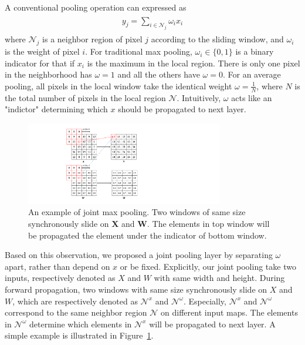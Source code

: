 A conventional pooling operation can expressed as
\begin{eqnarray}\label{pooling}
\begin{aligned}
y_{j} = \sum_{i\in \mathcal{N}_{j}} \omega_{i}x_{i}
\end{aligned}
\end{eqnarray}
where $\mathcal{N}_{j}$ is a neighbor region of pixel $j$ according to the sliding window, and $\omega_{i}$ is the weight of pixel $i$.
For traditional max pooling, $\omega_i \in \{0,1\}$ is a binary indicator for that if $x_i$ is the maximum in the local region.
There is only one pixel in the neighborhood has $\omega=1$ and all the others have $\omega=0$.
For an average pooling, all pixels in the local window take the identical weight $\omega=\frac{1}{N}$, where $N$ is the total number of pixels in the local region $\mathcal{N}$.
Intuitively, $\omega$ acts like an "indictor" determining which $x$ should be propagated to next layer.

\begin{figure}
    \begin{center}
        \includegraphics[width=3.4in]{figures/FigJMP.pdf}
    \end{center}
    \caption{An example of joint max pooling.
        Two windows of same size synchronously slide on $\mathbf{X}$ and $\mathbf{W}$.
       The elements in top window will be propagated the element under the indicator of bottom window.}
    \label{FigJMP}
\end{figure}

Based on this observation, we proposed a joint pooling layer  by separating $\omega$ apart, rather than depend on $x$ or be fixed.
Explicitly, our joint pooling take two inputs, respectively denoted as $X$ and $W$ with same width and height.
During forward propagation, two windows with same size synchronously slide on $X$ and $W$, which are respectively denoted as $\mathcal{N}^{x}$ and $\mathcal{N}^{\omega}$.
Especially, $\mathcal{N}^{x}$ and $\mathcal{N}^{\omega}$ correspond to the same neighbor region $\mathcal{N}$ on different input maps.
The elements in $\mathcal{N}^{\omega}$ determine which elements in $\mathcal{N}^{x}$ will be propagated to next layer.
A simple example is illustrated in Figure~\ref{FigJMP}.

